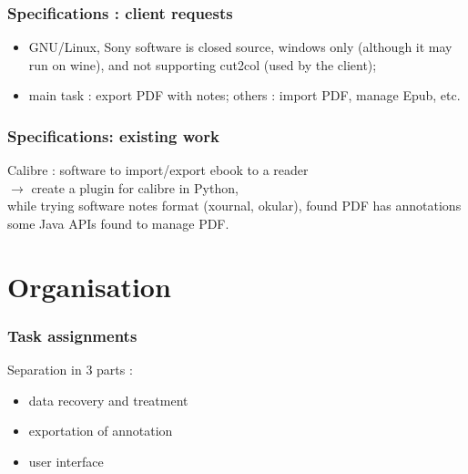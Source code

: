 \documentclass[t,12pt]{beamer}
\begin{document}
\begin{frame}
  \frametitle{Specifications : client requests}
  \begin{itemize}
    \item GNU/Linux,
    \pause Sony software is closed source, windows only (although
    it may run on wine), and not supporting cut2col (used by the
    client);
    \pause \item main task : export PDF with notes; \pause others :
    import PDF, manage Epub, etc.
  \end{itemize}
\end{frame}

\begin{frame}
  \frametitle{Specifications: existing work}
  Calibre : software to import/export ebook to a reader\\
  $\rightarrow$ create a plugin for calibre in Python,\\
  \pause while trying software notes format (xournal, okular),
  found PDF has annotations\\
  \pause some Java APIs found to manage PDF.
\end{frame}

\section{Organisation}
\begin{frame}
  \frametitle{Task assignments}
  Separation in 3 parts :
  \begin{itemize}
    \pause \item data recovery and treatment
	\pause \item exportation of annotation
	\pause \item user interface
  \end{itemize}
\end{frame}
\end{document}
